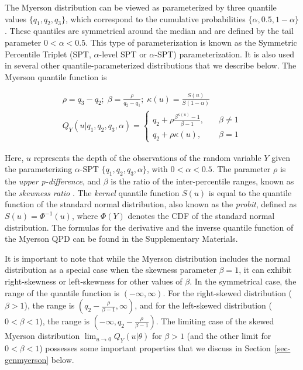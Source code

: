 \documentclass[
  fleqn,
  deca,
  blindrev
]{informs4}
\begin{document}
The Myerson distribution can be viewed as parameterized by three
quantile values \(\{q_1, q_2, q_3\}\), which correspond to the
cumulative probabilities \(\{\alpha, 0.5, 1-\alpha\}\). These quantiles
are symmetrical around the median and are defined by the tail parameter
\(0<\alpha<0.5\). This type of parameterization is known as the
Symmetric Percentile Triplet (SPT, \(\alpha\)-level SPT or
\(\alpha\)-SPT) parameterization. It is also used in several other
quantile-parameterized distributions that we describe below. The Myerson
quantile function is

\[
\begin{gathered}
\rho=q_3-q_2;\; 
\beta=\frac{\rho}{q_2-q_1};\;
\kappa(u)=\frac{S(u)}{S(1-\alpha)}\\
Q_Y(u \vert q_1,q_2,q_3,\alpha)=
\begin{cases}
q_2+\rho\frac{\beta^{\kappa(u)}-1}{\beta-1}, \quad &\beta \neq 1\\
q_2+\rho\kappa(u), \quad &\beta =1
\end{cases}
\end{gathered}
\]

Here, \(u\) represents the depth of the observations of the random
variable \(Y\) given the parameterizing \(\alpha\)-SPT
\(\{q_1, q_2, q_3, \alpha\}\), with \(0 < \alpha < 0.5\). The parameter
\(\rho\) is the \emph{upper p-difference}, and \(\beta\) is the ratio of
the inter-percentile ranges, known as the \emph{skewness ratio}
\citep[72]{gilchrist2000StatisticalModellingQuantile}. The \emph{kernel}
quantile function \(S(u)\) is equal to the quantile function of the
standard normal distribution, also known as the \emph{probit}, defined
as \(S(u) = \Phi^{-1}(u)\), where \(\Phi(Y)\) denotes the CDF of the
standard normal distribution. The formulas for the derivative and the
inverse quantile function of the Myerson QPD can be found in the
Supplementary Materials.

It is important to note that while the Myerson distribution includes the
normal distribution as a special case when the skewness parameter
\(\beta = 1\), it can exhibit right-skewness or left-skewness for other
values of \(\beta\). In the symmetrical case, the range of the quantile
function is \((-\infty, \infty)\). For the right-skewed distribution
(\(\beta > 1\)), the range is
\((q_2 - \frac{\rho}{\beta - 1}, \infty)\), and for the left-skewed
distribution (\(0 < \beta < 1\)), the range is
\((-\infty, q_2 - \frac{\rho}{\beta - 1})\). The limiting case of the
skewed Myerson distribution \(\lim_{u \rightarrow 0} Q_Y(u\vert\theta)\)
for \(\beta > 1\) (and the other limit for \(0 < \beta < 1\)) possesses
some important properties that we discuss in
Section~\ref{sec-genmyerson} below.
\end{document}
